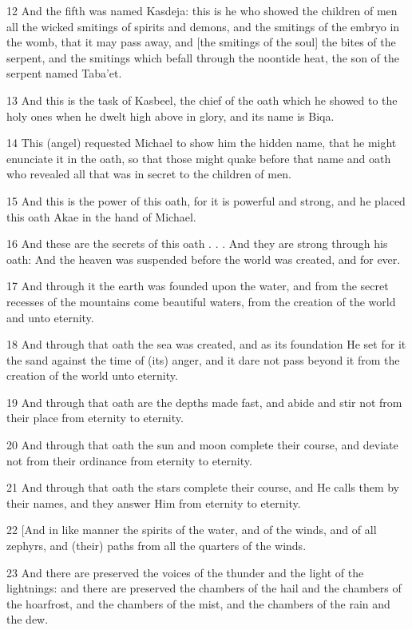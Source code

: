 \par 12 And the fifth was named Kasdeja: this is he who showed the children of men all the wicked smitings of spirits and demons, and the smitings of the embryo in the womb, that it may pass away, and [the smitings of the soul] the bites of the serpent, and the smitings which befall through the noontide heat, the son of the serpent named Taba'et.
\par 13 And this is the task of Kasbeel, the chief of the oath which he showed to the holy ones when he dwelt high above in glory, and its name is Biqa.
\par 14 This (angel) requested Michael to show him the hidden name, that he might enunciate it in the oath, so that those might quake before that name and oath who revealed all that was in secret to the children of men.
\par 15 And this is the power of this oath, for it is powerful and strong, and he placed this oath Akae in the hand of Michael.
\par 16 And these are the secrets of this oath . . . And they are strong through his oath: And the heaven was suspended before the world was created, and for ever.
\par 17 And through it the earth was founded upon the water, and from the secret recesses of the mountains come beautiful waters, from the creation of the world and unto eternity.
\par 18 And through that oath the sea was created, and as its foundation He set for it the sand against the time of (its) anger, and it dare not pass beyond it from the creation of the world unto eternity.
\par 19 And through that oath are the depths made fast, and abide and stir not from their place from eternity to eternity.
\par 20 And through that oath the sun and moon complete their course, and deviate not from their ordinance from eternity to eternity.
\par 21 And through that oath the stars complete their course, and He calls them by their names, and they answer Him from eternity to eternity.
\par 22 [And in like manner the spirits of the water, and of the winds, and of all zephyrs, and (their) paths from all the quarters of the winds.
\par 23 And there are preserved the voices of the thunder and the light of the lightnings: and there are preserved the chambers of the hail and the chambers of the hoarfrost, and the chambers of the mist, and the chambers of the rain and the dew.
